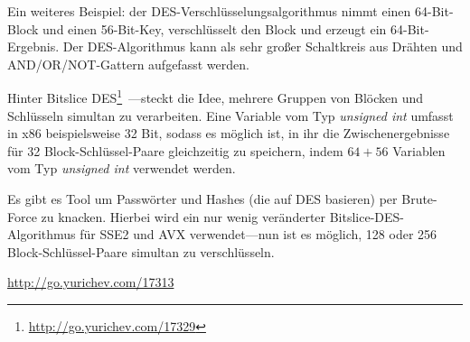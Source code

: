 Ein weiteres Beispiel: der DES-Verschlüsselungsalgorithmus nimmt einen 64-Bit-Block und einen 56-Bit-Key, verschlüsselt
den Block und erzeugt ein 64-Bit-Ergebnis. 
Der DES-Algorithmus kann als sehr großer Schaltkreis aus Drähten und AND/OR/NOT-Gattern aufgefasst werden.

\label{bitslicedes}
\newcommand{\URLBS}{\url{http://go.yurichev.com/17329}}
Hinter Bitslice DES\footnote{\URLBS}~---steckt die Idee, mehrere Gruppen von Blöcken und Schlüsseln simultan zu
verarbeiten. Eine Variable vom Typ \emph{unsigned int} umfasst in x86 beispielsweise 32 Bit, sodass es möglich ist, in ihr
die Zwischenergebnisse für 32 Block-Schlüssel-Paare gleichzeitig zu speichern, indem $64+56$ Variablen vom Typ
\emph{unsigned int} verwendet werden.

\myindex{\oracle}
Es gibt es Tool um \oracle Passwörter und Hashes (die auf DES basieren) per Brute-Force zu knacken. Hierbei wird ein nur
wenig veränderter Bitslice-DES-Algorithmus für SSE2 und AVX verwendet---nun ist es möglich, 128 oder 256
Block-Schlüssel-Paare simultan zu verschlüsseln.

\url{http://go.yurichev.com/17313}




